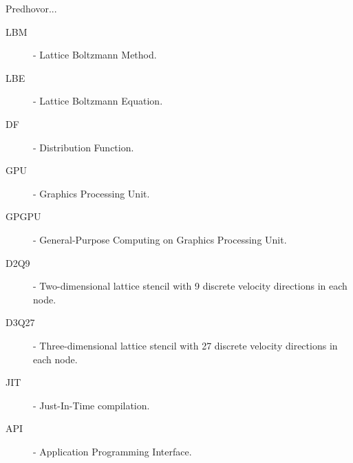 \documentclass[]{tukethesis}
\begin{document}
\preface %
Predhovor...
\endpreface

\thispagestyle{empty}
\tableofcontents
\newpage

\thispagestyle{empty}
\listoffigures
\newpage

\thispagestyle{empty}
\listoftables
\newpage

\thispagestyle{empty}
\printglossary %
\newpage

\listofterms %

\begin{description}
	\item[LBM] - Lattice Boltzmann Method.
	\item[LBE] - Lattice Boltzmann Equation.
	\item[DF] - Distribution Function.
	\item[GPU] - Graphics Processing Unit.
	\item[GPGPU] - General-Purpose Computing on Graphics Processing Unit.
	\item[D2Q9] - Two-dimensional lattice stencil with 9 discrete velocity directions in each node.
	\item[D3Q27] - Three-dimensional lattice stencil with 27 discrete velocity directions in each node.
	\item[JIT] - Just-In-Time compilation.
	\item[API] - Application Programming Interface.
\end{description}

\endlistofterms
%

%

%

%

%

%
%
\end{document}
